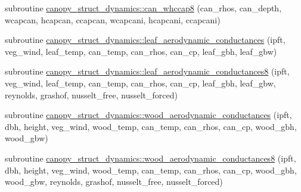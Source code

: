 \begin{DoxyCompactItemize}
subroutine \hyperlink{namespacecanopy__struct__dynamics_a006df1e2d1da5f482047ab4e18c561ef}{canopy\+\_\+struct\+\_\+dynamics\+::can\+\_\+whccap8} (can\+\_\+rhos, can\+\_\+depth, wcapcan, hcapcan, ccapcan, wcapcani, hcapcani, ccapcani)
\item 
subroutine \hyperlink{namespacecanopy__struct__dynamics_a301aac44c95414a23d8abe3b5826201f}{canopy\+\_\+struct\+\_\+dynamics\+::leaf\+\_\+aerodynamic\+\_\+conductances} (ipft, veg\+\_\+wind, leaf\+\_\+temp, can\+\_\+temp, can\+\_\+rhos, can\+\_\+cp, leaf\+\_\+gbh, leaf\+\_\+gbw)
\item 
subroutine \hyperlink{namespacecanopy__struct__dynamics_a603f1234645bf9624c578131440e8555}{canopy\+\_\+struct\+\_\+dynamics\+::leaf\+\_\+aerodynamic\+\_\+conductances8} (ipft, veg\+\_\+wind, leaf\+\_\+temp, can\+\_\+temp, can\+\_\+rhos, can\+\_\+cp, leaf\+\_\+gbh, leaf\+\_\+gbw, reynolds, grashof, nusselt\+\_\+free, nusselt\+\_\+forced)
\item 
subroutine \hyperlink{namespacecanopy__struct__dynamics_ada33113f2dc56fb4576d2a52d2a573b0}{canopy\+\_\+struct\+\_\+dynamics\+::wood\+\_\+aerodynamic\+\_\+conductances} (ipft, dbh, height, veg\+\_\+wind, wood\+\_\+temp, can\+\_\+temp, can\+\_\+rhos, can\+\_\+cp, wood\+\_\+gbh, wood\+\_\+gbw)
\item 
subroutine \hyperlink{namespacecanopy__struct__dynamics_a0c4e4737235809c386a5b5cab02086f1}{canopy\+\_\+struct\+\_\+dynamics\+::wood\+\_\+aerodynamic\+\_\+conductances8} (ipft, dbh, height, veg\+\_\+wind, wood\+\_\+temp, can\+\_\+temp, can\+\_\+rhos, can\+\_\+cp, wood\+\_\+gbh, wood\+\_\+gbw, reynolds, grashof, nusselt\+\_\+free, nusselt\+\_\+forced)
\end{DoxyCompactItemize}
